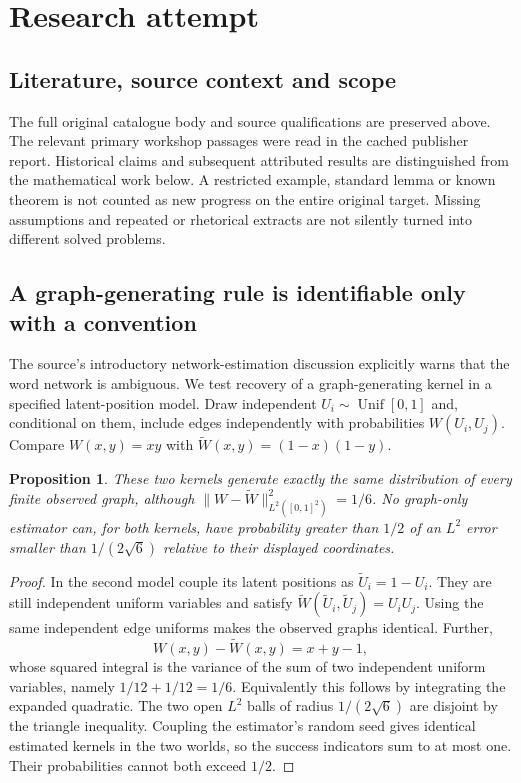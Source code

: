 \documentclass[11pt]{article}
\newtheorem{proposition}{Proposition}
\begin{document}
\section{Research attempt}
\subsection{Literature, source context and scope}
The full original catalogue body and source qualifications are preserved above. The relevant primary workshop passages were read in the cached publisher report. Historical claims and subsequent attributed results are distinguished from the mathematical work below. A restricted example, standard lemma or known theorem is not counted as new progress on the entire original target. Missing assumptions and repeated or rhetorical extracts are not silently turned into different solved problems.

\subsection{A graph-generating rule is identifiable only with a convention}
The source's introductory network-estimation discussion explicitly warns that the word network is ambiguous. We test recovery of a graph-generating kernel in a specified latent-position model. Draw independent $U_i\sim\operatorname{Unif}[0,1]$ and, conditional on them, include edges independently with probabilities $W(U_i,U_j)$. Compare $W(x,y)=xy$ with $\widetilde W(x,y)=(1-x)(1-y)$.
\begin{proposition}
These two kernels generate exactly the same distribution of every finite observed graph, although $\|W-\widetilde W\|_{L^2([0,1]^2)}^2=1/6$. No graph-only estimator can, for both kernels, have probability greater than $1/2$ of an $L^2$ error smaller than $1/(2\sqrt6)$ relative to their displayed coordinates.
\end{proposition}
\begin{proof}
In the second model couple its latent positions as $\widetilde U_i=1-U_i$. They are still independent uniform variables and satisfy $\widetilde W(\widetilde U_i,\widetilde U_j)=U_iU_j$. Using the same independent edge uniforms makes the observed graphs identical. Further,
\[
W(x,y)-\widetilde W(x,y)=x+y-1,
\]
whose squared integral is the variance of the sum of two independent uniform variables, namely $1/12+1/12=1/6$. Equivalently this follows by integrating the expanded quadratic. The two open $L^2$ balls of radius $1/(2\sqrt6)$ are disjoint by the triangle inequality. Coupling the estimator's random seed gives identical estimated kernels in the two worlds, so the success indicators sum to at most one. Their probabilities cannot both exceed $1/2$.
\end{proof}
\end{document}
